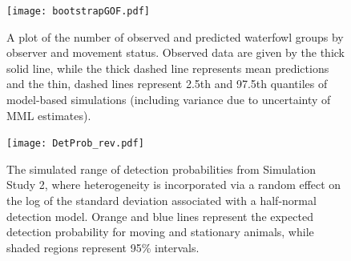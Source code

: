 \documentclass[aoas,preprint]{imsart}
\numberwithin{equation}{section}
\theoremstyle{plain}
\begin{document}
\pagebreak
\begin{figure}
\begin{center}
\texttt{[image: bootstrapGOF.pdf]}
\caption{A plot of the number of observed and predicted waterfowl groups by observer and movement status.  Observed data are given by the thick solid line, while the thick dashed line represents mean predictions and the thin, dashed lines represent 2.5th and 97.5th quantiles of model-based simulations (including variance due to uncertainty of MML estimates).  }
\label{fig:GOF}
\end{center}
\end{figure}

\pagebreak
\begin{figure}
\begin{center}
\texttt{[image: DetProb\_rev.pdf]}
\caption{The simulated range of detection probabilities from Simulation Study 2, where heterogeneity is incorporated via a random effect on the log of the standard deviation associated with a half-normal detection model.  Orange and blue lines represent the expected detection probability for moving and stationary animals, while shaded regions represent 95\% intervals.}
\label{fig:hn}
\end{center}
\end{figure}
\end{document}

